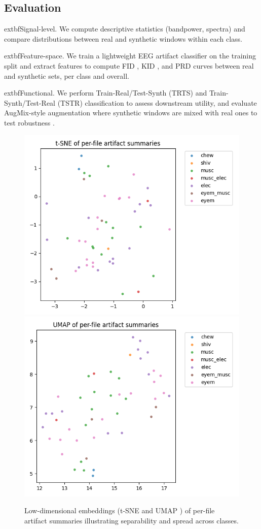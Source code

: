 \documentclass{article}
\begin{document}
\subsection{Evaluation}
	extbf{Signal-level.} We compute descriptive statistics (bandpower, spectra) and compare distributions between real and synthetic windows within each class.

	extbf{Feature-space.} We train a lightweight EEG artifact classifier on the training split and extract features to compute FID \citep{heusel2017gans}, KID \citep{binkowski2018demystifying}, and PRD curves \citep{sajjadi2018assessing} between real and synthetic sets, per class and overall.

	extbf{Functional.} We perform Train-Real/Test-Synth (TRTS) and Train-Synth/Test-Real (TSTR) classification to assess downstream utility, and evaluate AugMix-style augmentation where synthetic windows are mixed with real ones to test robustness \citep{hendrycks2020augmix}.

\begin{figure}[t]
    \centering
    \includegraphics[width=.48\linewidth]{figs/tsne_perfile_summaries.png}\hfill
    \includegraphics[width=.48\linewidth]{figs/umap_perfile_summaries.png}
    \caption{Low-dimensional embeddings (t-SNE \citep{maaten2008visualizing} and UMAP \citep{mcinnes2018umap}) of per-file artifact summaries illustrating separability and spread across classes.}
\end{figure}
\end{document}
